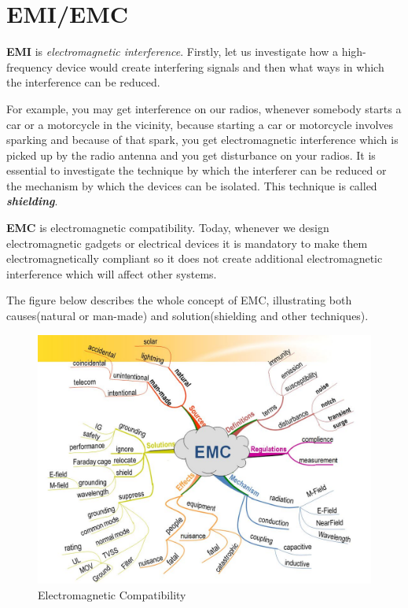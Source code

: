 \section{EMI/EMC}

\textbf{EMI} is \textit{electromagnetic interference}. Firstly, let us investigate how a high-frequency device would create interfering signals and then what ways in which the interference can be reduced.

For example, you may get interference on our radios, whenever somebody starts a car or a motorcycle in the vicinity, because starting a car or motorcycle involves sparking and because of that spark, you get electromagnetic interference which is picked up by the radio antenna and you get disturbance on your radios. It is essential to investigate the technique by which the interferer can be reduced or the mechanism by which the devices can be isolated. This technique is called \textit{\textbf{shielding}}.

\textbf{EMC} is electromagnetic compatibility. Today, whenever we design electromagnetic gadgets or electrical devices it is mandatory to make them electromagnetically compliant so it does not create additional electromagnetic interference which will affect other systems.

The figure below describes the whole concept of EMC, illustrating both causes(natural or man-made) and solution(shielding and other techniques).

\begin{figure}[h]
\centering
\includegraphics[scale=0.35]{./graphics/634771461726914062}
\caption{Electromagnetic Compatibility}
\label{fig:634771461726914062}
\end{figure}
